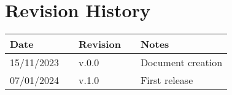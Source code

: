 \chapter*{Revision History}

\begin{table}[h]
    \centering
    \begin{tabular}{l p{2.5cm} l p{2.5cm} l}
        \hline
        \textbf{Date} &  & \textbf{Revision} &  & \textbf{Notes}    \\ \hline
        15/11/2023    &  & v.0.0             &  & Document creation \\
        07/01/2024    &  & v.1.0             &  & First release      \\ \hline
    \end{tabular}
\end{table}

\newpage